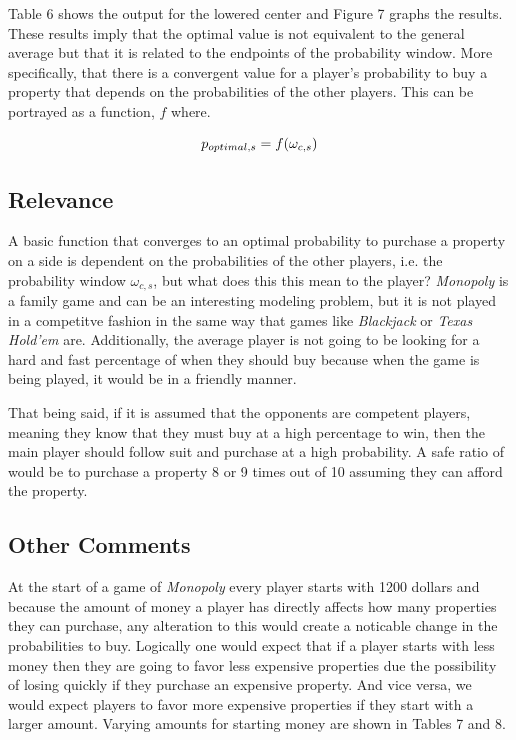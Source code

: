 \documentclass{article}
\begin{document}
Table 6 shows the output for the lowered center and Figure 7 graphs the results.  These results imply that the optimal value is not equivalent to the general average but that it is related to the endpoints of the probability window.  More specifically, that there is a convergent value for a player's probability to buy a property that depends on the probabilities of the other players.  This can be portrayed as a function, $f$ where.

\begin{equation}
\centering
p_{optimal,s} = f(\omega_{c,s})
\end{equation}


\subsection{Relevance}

A basic function that converges to an optimal probability to purchase a property on a side is dependent on the probabilities of the other players, i.e. the probability window $\omega_{c,s}$, but what does this this mean to the player?  \textit{Monopoly} is a family game and can be an interesting modeling problem, but it is not played in a competitve fashion in the same way that games like \textit{Blackjack} or \textit{Texas Hold'em} are.  Additionally, the average player is not going to be looking for a hard and fast percentage of when they should buy because when the game is being played, it would be in a friendly manner.  

That being said, if it is assumed that the opponents are competent players, meaning they know that they must buy at a high percentage to win, then the main player should follow suit and purchase at a high probability.  A safe ratio of would be to purchase a property 8 or 9 times out of 10 assuming they can afford the property.

\subsection{Other Comments}

At the start of a game of \textit{Monopoly} every player starts with 1200 dollars and because the amount of money a player has directly affects how many properties they can purchase, any alteration to this would create a noticable change in the probabilities to buy.  Logically one would expect that if a player starts with less money then they are going to favor less expensive properties due the possibility of losing quickly if they purchase an expensive property. And vice versa, we would expect players to favor more expensive properties if they start with a larger amount.  Varying amounts for starting money are shown in Tables 7 and 8.
\end{document}
